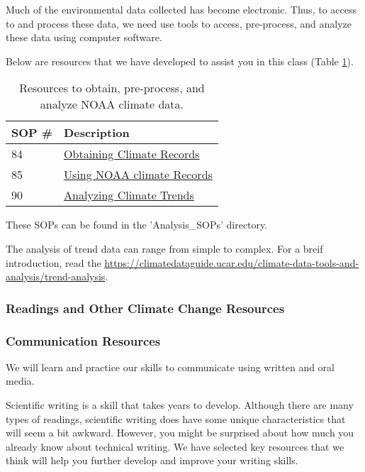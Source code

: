 \documentclass{article}\usepackage[]{graphicx}\usepackage[]{color}
\begin{document}
Much of the environmental data collected has become electronic. Thus, to access to and process these data, we need use tools to access, pre-process, and analyze these data using computer software. 

Below are resources that we have developed to assist you in this class (Table \ref{tab:tools}).

\begin{table}[h]

\caption{Resources to obtain, pre-process, and analyze NOAA climate data.}\label{tab:tools}
\centering
\begin{tabular}{ll}\hline
SOP \#    & Description                                 \\\hline\hline
84        & \href{https://github.com/marclos/Climate_Change_Narratives/raw/master/Analysis_SOPs/SOP84_Obtaining_Climate_Records.pdf}{Obtaining Climate Records}\\
85        & \href{https://github.com/marclos/Climate_Change_Narratives/raw/master/Analysis_SOPs/SOP85_Using_NOAA_Climate_Records.pdf}{Using NOAA climate Records}\\
90        & \href{https://github.com/marclos/Climate_Change_Narratives/raw/master/Analysis_SOPs/SOP90_Analyzing_Trends.pdf}{Analyzing Climate Trends} \\ \hline

\end{tabular}
\end{table}

These SOPs can be found in the 'Analysis\_SOPs' directory.

The analysis of trend data can range from simple to complex. For a breif introduction, read the \url{https://climatedataguide.ucar.edu/climate-data-tools-and-analysis/trend-analysis}.

\subsubsection{Readings and Other Climate Change Resources}



\subsubsection{Communication Resources}

We will learn and practice our skills to communicate using written and oral media. 

Scientific writing is a skill that takes years to develop. Although there are many types of readings, scientific writing does have some unique characteristics that will seem a bit awkward. However, you might be surprised about how much you already know about technical writing. We have selected key resources that we think will help you further develop and improve your writing skills.
\end{document}
